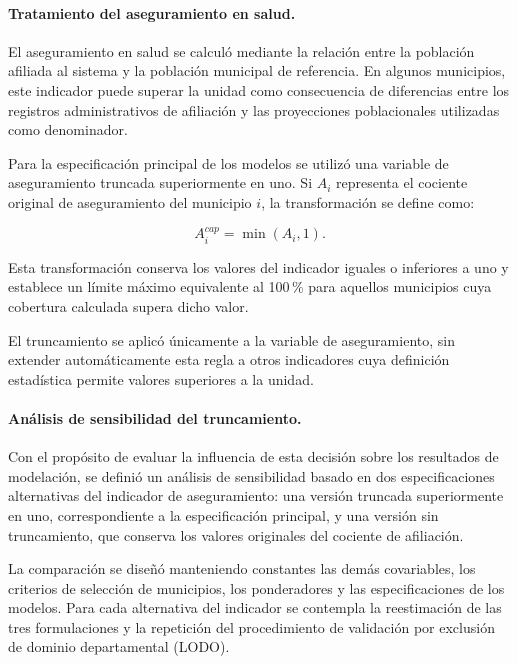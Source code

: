 \paragraph{Tratamiento del aseguramiento en salud.}

El aseguramiento en salud se calculó mediante la relación entre la población afiliada al sistema y la población municipal de referencia. En algunos municipios, este indicador puede superar la unidad como consecuencia de diferencias entre los registros administrativos de afiliación y las proyecciones poblacionales utilizadas como denominador.

Para la especificación principal de los modelos se utilizó una variable de aseguramiento truncada superiormente en uno. Si $A_i$ representa el cociente original de aseguramiento del municipio $i$, la transformación se define como:

\begin{equation}
A_i^{cap}=\min(A_i,1).
\label{eq:aseguramiento-capado}
\end{equation}

Esta transformación conserva los valores del indicador iguales o inferiores a uno y establece un límite máximo equivalente al 100\,\% para aquellos municipios cuya cobertura calculada supera dicho valor.

El truncamiento se aplicó únicamente a la variable de aseguramiento, sin extender automáticamente esta regla a otros indicadores cuya definición estadística permite valores superiores a la unidad.

\paragraph{Análisis de sensibilidad del truncamiento.}

Con el propósito de evaluar la influencia de esta decisión sobre los resultados de modelación, se definió un análisis de sensibilidad basado en dos especificaciones alternativas del indicador de aseguramiento: una versión truncada superiormente en uno, correspondiente a la especificación principal, y una versión sin truncamiento, que conserva los valores originales del cociente de afiliación.

La comparación se diseñó manteniendo constantes las demás covariables, los criterios de selección de municipios, los ponderadores y las especificaciones de los modelos. Para cada alternativa del indicador se contempla la reestimación de las tres formulaciones y la repetición del procedimiento de validación por exclusión de dominio departamental (LODO).

